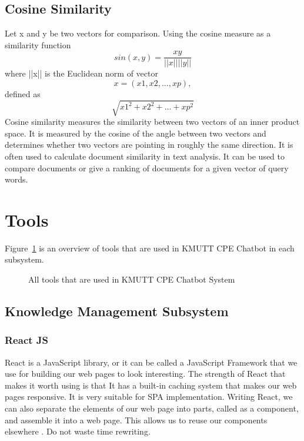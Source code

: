 \documentclass[12pt,oneside,openright,a4paper]{cpe-english-project}
\begin{document}
\subsection{Cosine Similarity}
Let x and y be two vectors for comparison. Using the cosine measure as a similarity function
\[sin(x,y) = \frac{xy}{||x||||y||}\]
where ||x|| is the Euclidean norm of vector
\[x =(x1, x2, ..., xp),\] defined as \[\sqrt{x1^2+x2^2+...+xp^2}\]
Cosine similarity measures the similarity between two vectors of an inner product space.\cite{cosine} It is measured by the cosine of the angle between two vectors and determines whether two vectors are pointing in roughly the same direction. It is often used to calculate document similarity in text analysis. It can be used to compare documents or give a ranking of documents for a given vector of query words.

\section{Tools}
Figure~\ref*{fig:ch3_tools} is an overview of tools that are used in KMUTT CPE Chatbot in each subsystem.
\begin{figure}[h!]
  \centering
  \setlength{\fboxrule}{0.2mm}
  \setlength{\fboxsep}{0.5cm}
  \caption{All tools that are used in KMUTT CPE Chatbot System}
  \label{fig:ch3_tools}
\end{figure}

\subsection{Knowledge Management Subsystem}
\subsubsection{React JS}
React is a JavaScript library, or it can be called a JavaScript Framework that we use for building
our web pages to look interesting. The strength of React that makes it worth using is that It has
a built-in caching system that makes our web pages responsive. It is very suitable for SPA
implementation. Writing React, we can also separate the elements of our web page into parts,
called as a component, and assemble it into a web page. This allows us to reuse our components
elsewhere \cite{what_is_react}. Do not waste time rewriting.
\end{document}
